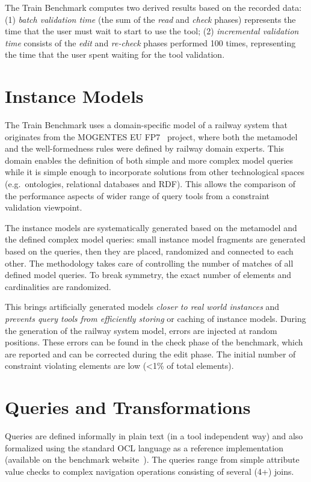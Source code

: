 The Train Benchmark computes two derived results based on the recorded data:
(1) \emph{batch validation time} (the sum of the \emph{read} and \emph{check} phases)
represents the time that the user must wait to start to use the tool; (2)
\emph{incremental validation time} consists of the \emph{edit} and
\emph{re-check} phases performed 100 times, representing the time that the
user spent waiting for the tool validation.


\section{Instance Models}
The Train Benchmark uses a domain-specific model of a railway system that
originates from the \mbox{MOGENTES} EU FP7~\cite{Mogentes} project, where both the metamodel and the
well-formedness rules were defined by railway domain experts. This domain
enables the definition of both simple and more complex model queries while it is
simple enough to incorporate solutions from other technological spaces
(e.g.\ ontologies, relational databases and RDF). This allows the comparison of
the performance aspects of wider range of query tools from a constraint
validation viewpoint.

The instance models are systematically generated based on the metamodel and the
defined complex model queries: small instance model fragments are generated
based on the queries, then they are placed, randomized and connected to each
other. The methodology takes care of controlling the number of matches of all
defined model queries. To break symmetry, the exact number of elements and
cardinalities are randomized.
 
This brings artificially generated models \emph{closer to real world instances}
and \emph{prevents query tools from efficiently storing} or caching of instance
models. During the generation of the railway system model, errors are injected
at random positions. These errors can be found in the check phase of the
benchmark, which are reported and can be corrected during the edit phase. The
initial number of constraint violating elements are low (<1\% of total
elements).
 
\section{Queries and Transformations}
Queries are defined informally in plain text (in a tool independent way) and
also formalized using the standard OCL language as a reference implementation
(available on the benchmark website~\cite{TBwebsite}). The queries range from
simple attribute value checks to complex navigation operations consisting of
several (4+) joins.

